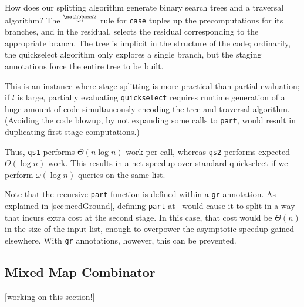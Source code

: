 How does our splitting algorithm generate binary search trees and a traversal
algorithm? The $\splittwosym$ rule for \texttt{case} tuples up the
precomputations for its branches, and in the residual, selects the residual
corresponding to the appropriate branch. The tree is implicit in the structure
of the code; ordinarily, the quickselect algorithm only explores a single
branch, but the staging annotations force the entire tree to be built.

This is an instance where stage-splitting is more practical than partial
evaluation; if $l$ is large, partially evaluating \texttt{quickselect} requires
runtime generation of a huge amount of code simultaneously encoding the tree and
traversal algorithm. (Avoiding the code blowup, by not expanding some calls to
\texttt{part}, would result in duplicating first-stage computations.)

Thus, \texttt{qs1} performs $\Theta(n \log n)$ work per call, whereas
\texttt{qs2} performs expected $\Theta(\log n)$ work.  This results in a net
speedup over standard quickselect if we perform $\omega(\log n)$ queries on
the same list. 

Note that the recursive \texttt{part} function is defined within a \texttt{gr}
annotation.  As explained in \ref{sec:needGround}, defining \texttt{part}
at \bbonem\ would cause it to split in a way that incurs extra cost at the second stage.
In this case, that cost would be $\Theta(n)$ in the size of the input list,
enough to overpower the asymptotic speedup gained elsewhere.
With \texttt{gr} annotations, however, this can be prevented.
%

\subsection {Mixed Map Combinator}

[working on this section!]

